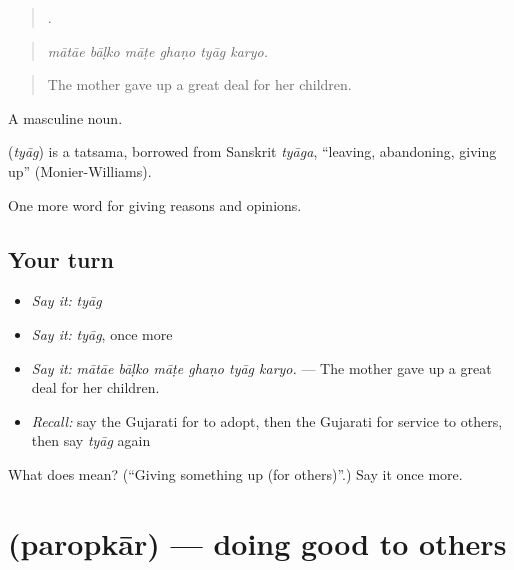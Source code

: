 \begin{quote}
     .
\end{quote}

\begin{quote}
\emph{mātāe bāḷko māṭe ghaṇo tyāg karyo.}
\end{quote}

\begin{quote}
The mother gave up a great deal for her children.
\end{quote}

A masculine noun.

\begin{cousinweb}
\textbf{} (\emph{tyāg}) is a tatsama, borrowed from Sanskrit \emph{tyāga}, \textquotedblleft{}leaving, abandoning, giving up\textquotedblright{} (Monier-Williams).
\end{cousinweb}

\begin{grammarlens}[title={What you've built}]
One more word for giving reasons and opinions.
\end{grammarlens}

\subsection*{Your turn}
\begin{itemize}
\raggedright
  \item \emph{Say it:} \emph{tyāg}
  \item \emph{Say it:} \emph{tyāg}, once more
  \item \emph{Say it:} \emph{mātāe bāḷko māṭe ghaṇo tyāg karyo.} — The mother gave up a great deal for her children.
  \item \emph{Recall:} say the Gujarati for to adopt, then the Gujarati for service to others, then say \emph{tyāg} again
\end{itemize}

\begin{tcolorbox}[breakable,colback=teal!4,colframe=teal!35!black,title={Before you move on}]
What does  mean? (\textquotedblleft{}Giving something up (for others)\textquotedblright{}.) Say it once more.
\end{tcolorbox}
\section[\texorpdfstring{\gu{પરોપકાર} (paropkār)}{પરોપકાર (paropkār)}]{ (paropkār) — doing good to others}

